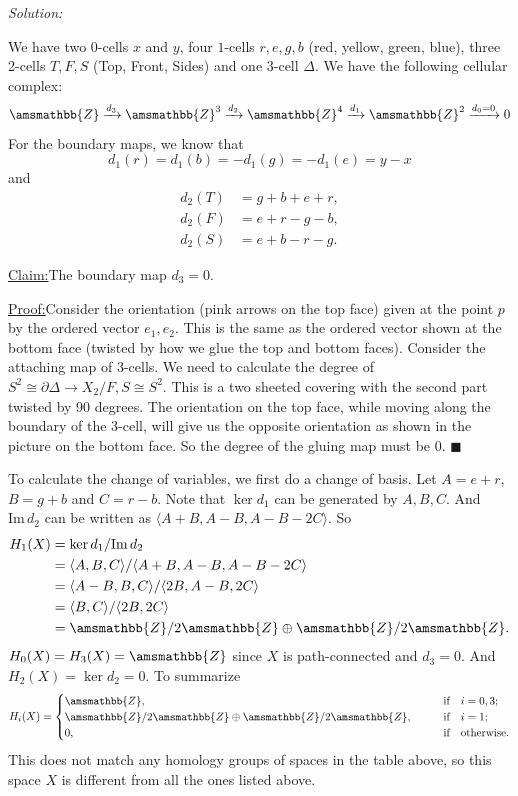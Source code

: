 \documentclass[a4paper, 12pt]{article}
\newenvironment{solution}
    {\textit{Solution:}}
    {}
\newenvironment{claim}[1]{\par\noindent\underline{Claim:}\space#1}{}
\newenvironment{claimproof}[1]{\par\noindent\underline{Proof:}\space#1}{\hfill $\blacksquare$}
\newcommand{\im}{\text{Im}\,}
\newcommand{\la}{\langle}
\newcommand{\ra}{\rangle}
\renewcommand{\mathbb}{\amsmathbb}
\newcommand{\iif}{\ \ \ \text{if}\ \ \ }
\begin{document}
\begin{solution}
\begin{enumerate}[(a)]
We have two 0-cells \(x\) and \(y\), four \(1\)-cells \(r,e,g,b\) (red, yellow, green, blue), three 2-cells \(T,F,S\) (Top, Front, Sides) and one 3-cell \(\Delta\). We have the following cellular complex: 
\[\mathbb{Z}\xrightarrow{d_3}\mathbb{Z}^3\xrightarrow{d_2}\mathbb{Z}^4\xrightarrow{ d_1}\mathbb{Z}^2\xrightarrow{d_0=0}0\]
For the boundary maps, we know that 
\[d_1(r)=d_1(b)=-d_1(g)=-d_1(e)=y-x\]
and 
\begin{align*}
	d_2(T)&=g+b+e+r,\\ 
	d_2(F)&=e+r-g-b,\\ 
	d_2(S)&=e+b-r-g.
\end{align*}
\begin{claim}
The boundary map \(d_3=0\).
\end{claim}
\begin{claimproof}
Consider the orientation (pink arrows on the top face) given at the point \(p\) by the ordered vector \(e_1,e_2\). This is the same as the ordered vector shown at the bottom face (twisted by how we glue the top and bottom faces). Consider the attaching 
map of 3-cells. We need to calculate the degree of \(S^2\cong\partial \Delta\rightarrow X_2/F,S\cong S^2 \). This is a two sheeted covering with the second part twisted by 90 degrees. The orientation on the top face, while moving along the boundary of the 3-cell, will give 
us the opposite orientation as shown in the picture on the bottom face. So the degree of the gluing map must be 0.
\end{claimproof}

To calculate the change of variables, we first do a change of basis. Let \(A=e+r\), \(B=g+b\) and \(C=r-b\). Note that \(\ker d_1\) can be generated by \(A,B,C\). And \(\im d_2\) can be written as 
\(\la A+B,A-B,A-B-2C \ra\). So 
\begin{align*}
	H_1(X)&=\ker d_1/\im d_2\\ 
	      &=\la A,B,C\ra/\la A+B,A-B,A-B-2C\ra\\ 
	      &=\la A-B,B,C\ra/\la 2B, A-B, 2C\ra\\ 
		  &=\la B,C\ra/\la 2B,2C\ra\\ 
		  &=\mathbb{Z}/2 \mathbb{Z}\oplus \mathbb{Z}/2 \mathbb{Z}.
\end{align*}
\(H_0(X)=H_3(X)=\mathbb{Z}\) since \(X\) is path-connected and \(d_3=0\). And 
\(H_2(X)=\ker d_2=0\). To summarize 
\[H_i(X)=\begin{cases}
	\mathbb{Z},&\ \ \ \iif i=0,3;\\ 
	\mathbb{Z}/2 \mathbb{Z}\oplus \mathbb{Z}/2 \mathbb{Z},&\ \ \ \iif i=1;\\ 
	0,&\ \ \ \iif \text{otherwise}.
\end{cases}\] 
This does not match any homology groups of spaces in the table above, so this space \(X\) is different from all the ones listed above. 
\end{enumerate}
\end{solution}
\end{document}
